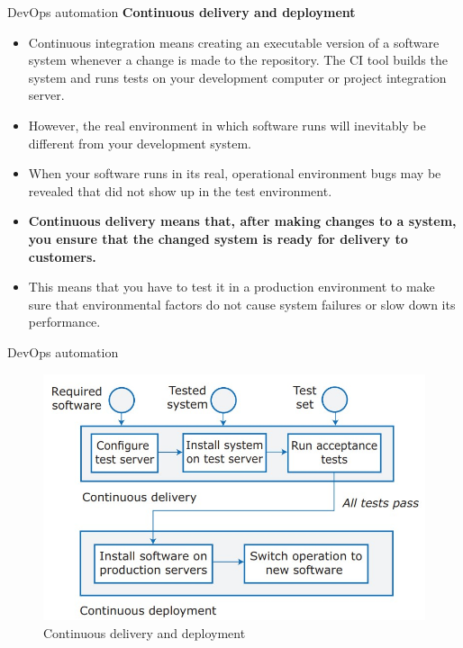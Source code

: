 \documentclass{beamer}
\begin{document}
\begin{frame}{DevOps automation}
	\textbf{Continuous delivery and deployment}
	\begin{itemize}
		\item Continuous integration means creating an executable version of a software system whenever a change is made to the repository. The CI tool builds the system and runs tests on your development computer or project integration server. 
		\item However, the real environment in which software runs will inevitably be different from your development system. 
		\item When your software runs in its real, operational environment bugs may be revealed that did not show up in the test environment.
		\item \textbf{Continuous delivery means that, after making changes to a system, you ensure that the changed system is ready for delivery to customers.}
		\item This means that you have to test it in a production environment to make sure that environmental factors do not cause system failures or slow down its performance.
	\end{itemize}
\end{frame}
\begin{frame}{DevOps automation}
	\begin{figure}
		\includegraphics[scale=.5]{img/m3_43}
		\caption{Continuous delivery and deployment}
	\end{figure}
\end{frame}
\end{document}
